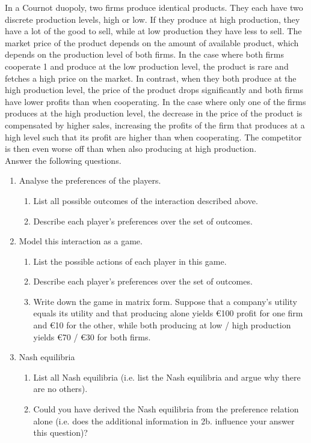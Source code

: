 \documentclass[../main.tex]{subfiles}
\begin{document}
\begin{question}
In a Cournot duopoly, two firms produce identical products. They each have two discrete production levels, high or low. If they produce at high production, they have a lot of the good to sell, while at low production they have less to sell. The market price of the product depends on the amount of available product, which depends on the production level of both firms. In the case where both firms cooperate 1 and produce at the low production level, the product is rare and fetches a high price on the market. In contrast, when they both produce at the high production level, the price of the product drops significantly and both firms have lower profits than when cooperating. In the case where only one of the firms produces at the high production level, the decrease in the price of the product is compensated by higher sales, increasing the profits of the firm that produces at a high level such that its profit are higher than when cooperating. The competitor is then even worse off than when also producing at high production.\\

Answer the following questions.
\begin{enumerate}
	\item Analyse the preferences of the players.
	\begin{enumerate}
		\item List all possible outcomes of the interaction described above.
		\item Describe each player’s preferences over the set of outcomes.
	\end{enumerate}
	\item Model this interaction as a game.
	\begin{enumerate}
		\item List the possible actions of each player in this game.
		\item Describe each player’s preferences over the set of outcomes.
		\item Write down the game in matrix form. Suppose that a company’s utility equals its utility and that producing alone yields \euro 100 profit for one firm and \euro10 for the other, while both producing at low / high production yields \euro70 / \euro30 for both firms.
	\end{enumerate}
	
	\item Nash equilibria
	\begin{enumerate}
		\item List all Nash equilibria (i.e. list the Nash equilibria and argue why there are no others). 
		\item Could you have derived the Nash equilibria from the preference relation alone (i.e. does the additional information in 2b. influence your answer this question)?
	\end{enumerate}
	

\end{enumerate}
\end{question}
\end{document}
